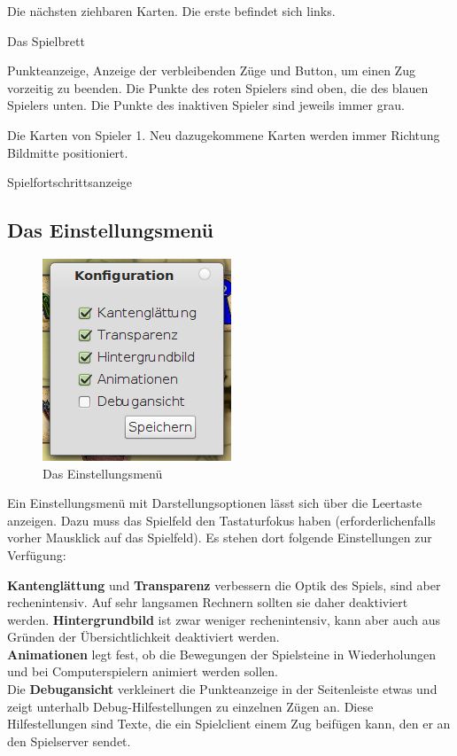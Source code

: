 \documentclass[a4paper, ngerman]{scrartcl}
\begin{document}
\begin{compactenum}[a)] \item Die nächsten ziehbaren Karten. Die erste befindet
sich links.
\item Das Spielbrett \item Punkteanzeige, Anzeige der verbleibenden Züge und
Button, um einen Zug vorzeitig zu beenden. Die Punkte des roten Spielers sind
oben, die des blauen Spielers unten. Die Punkte des inaktiven Spieler sind
jeweils immer grau.
\item Die Karten von Spieler 1. Neu dazugekommene Karten werden immer Richtung
Bildmitte positioniert.
\item Spielfortschrittsanzeige
	\end{compactenum}
	
\subsection{Das Einstellungsmenü}
	 \begin{figure}[h]
		\centering
		\includegraphics[scale=0.5]{bilder/configuration}
		\caption{Das Einstellungsmenü}
		\label{fig:Configuration}
	\end{figure}
	
	Ein Einstellungsmenü mit Darstellungsoptionen lässt
sich über die Leertaste anzeigen. Dazu muss das
Spielfeld den Tastaturfokus haben (erforderlichenfalls
vorher Mausklick auf das Spielfeld). Es stehen dort
folgende Einstellungen zur Verfügung:

\textbf{Kantenglättung} und \textbf{Transparenz} verbessern die Optik des
Spiels, sind aber rechenintensiv. Auf sehr langsamen Rechnern sollten sie daher
deaktiviert werden. \textbf{Hintergrundbild} ist zwar weniger rechenintensiv,
kann aber auch aus Gründen der Übersichtlichkeit deaktiviert werden.\\
\textbf{Animationen} legt fest, ob die Bewegungen der Spielsteine in
Wiederholungen und bei Computerspielern animiert werden sollen.\\
Die \textbf{Debugansicht} verkleinert die Punkteanzeige in der Seitenleiste
etwas und zeigt unterhalb Debug-Hilfestellungen zu einzelnen Zügen an. Diese
Hilfestellungen sind Texte, die ein Spielclient einem Zug beifügen kann, den er
an den Spielserver sendet.
	
\end{document}
